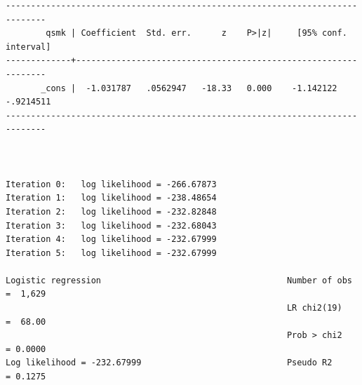 \documentclass[
  10pt,
  a4paper,
]{book}
\begin{document}
\begin{verbatim}
------------------------------------------------------------------------------
        qsmk | Coefficient  Std. err.      z    P>|z|     [95% conf. interval]
-------------+----------------------------------------------------------------
       _cons |  -1.031787   .0562947   -18.33   0.000    -1.142122   -.9214511
------------------------------------------------------------------------------



Iteration 0:   log likelihood = -266.67873  
Iteration 1:   log likelihood = -238.48654  
Iteration 2:   log likelihood = -232.82848  
Iteration 3:   log likelihood = -232.68043  
Iteration 4:   log likelihood = -232.67999  
Iteration 5:   log likelihood = -232.67999  

Logistic regression                                     Number of obs =  1,629
                                                        LR chi2(19)   =  68.00
                                                        Prob > chi2   = 0.0000
Log likelihood = -232.67999                             Pseudo R2     = 0.1275


\end{verbatim}
\end{document}

